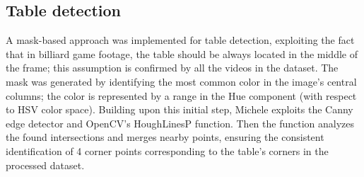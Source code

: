 \subsection{Table detection}
A mask-based approach was implemented for table detection, exploiting the fact that in billiard game footage, the table should be always located in the middle of the frame; this assumption is confirmed by all the videos in the dataset.
The mask was generated by identifying the most common color in the image's central columns; the color is represented by a range in the Hue component (with respect to HSV color space).
Building upon this initial step, Michele exploits the Canny edge detector and OpenCV's HoughLinesP function.
Then the function analyzes the found intersections and merges nearby points, ensuring the consistent identification of 4 corner points corresponding to the table's corners in the processed dataset.
